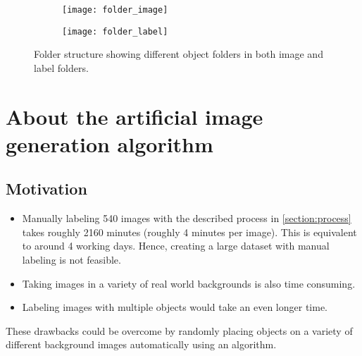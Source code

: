 \documentclass[paper=a4,11pt,parskip=half,toc=listof]{scrartcl}
\begin{document}
\begin{center}
	\begin{figure}[!htb]
		\begin{subfigure}{.5\textwidth}
			\centering
			\texttt{[image: folder\_image]}
			\label{Fig:6a}
		\end{subfigure}
		\begin{subfigure}{.5\textwidth}
			\centering
			\texttt{[image: folder\_label]}
			\label{Fig:6b}
		\end{subfigure}
		\caption{Folder structure showing different object folders in both image and label folders.}
		\label{Fig:6}
	\end{figure}
\end{center}

\section{About the artificial image generation algorithm}
\subsection{Motivation}
	\begin{itemize}
		\item Manually labeling 540 images with the described process in \ref{section:process} takes roughly 2160 minutes (roughly 4 minutes per image). This is equivalent to around 4 working days. Hence, creating a large dataset with manual labeling is not feasible.
		\item Taking images in a variety of real world backgrounds is also time consuming.
		\item Labeling images with multiple objects would take an even longer time.
	\end{itemize}
	
These drawbacks could be overcome by randomly placing objects on a variety of different background images automatically using an algorithm.
\end{document}
